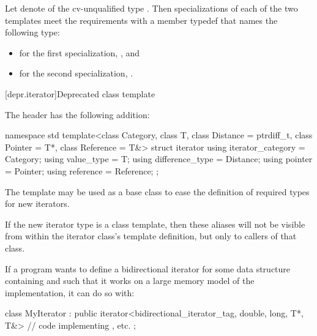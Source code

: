 \begin{itemdescr}
\pnum
Let  denote 
of the cv-unqualified type .
Then specializations of each of the two templates meet
the  requirements
with a member typedef  that names the following type:
\begin{itemize}
\item for the first specialization, , and
\item for the second specialization, .
\end{itemize}
\end{itemdescr}

[depr.iterator]{Deprecated  class template}

\pnum
The header  has the following addition:

%
\begin{codeblock}
namespace std {
  template<class Category, class T, class Distance = ptrdiff_t,
           class Pointer = T*, class Reference = T&>
  struct iterator {
    using iterator_category = Category;
    using value_type        = T;
    using difference_type   = Distance;
    using pointer           = Pointer;
    using reference         = Reference;
  };
}
\end{codeblock}

\pnum
The
template may be used as a base class to ease the definition of required types
for new iterators.

\pnum
\begin{note}
If the new iterator type is a class template, then these aliases
will not be visible from within the iterator class's template definition, but
only to callers of that class.
\end{note}

\pnum
\begin{example}
If a \Cpp{} program wants to define a bidirectional iterator for some data
structure containing  and such that it works on a large memory
model of the implementation, it can do so with:

\begin{codeblock}
class MyIterator :
  public iterator<bidirectional_iterator_tag, double, long, T*, T&> {
  // code implementing \tcode{++}, etc.
};
\end{codeblock}
\end{example}

